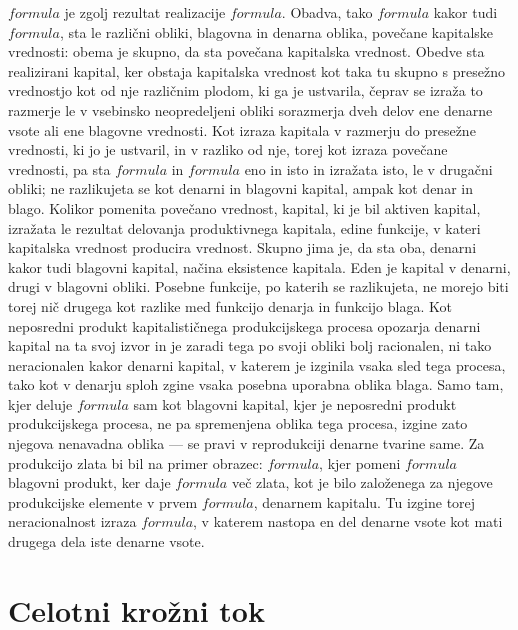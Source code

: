 \documentclass[a5paper]{scrbook}
\begin{document}
\( formula \) je zgolj rezultat realizacije \( formula \). Obadva, tako \( formula \) kakor tudi \( formula \), sta le različni obliki, blagovna in denarna oblika, povečane kapitalske vrednosti: obema je skupno, da sta povečana kapitalska vrednost. Obedve sta realizirani kapital, ker obstaja kapitalska vrednost kot taka tu skupno s presežno vrednostjo kot od nje različnim plodom, ki ga je ustvarila, čeprav se izraža to razmerje le v vsebinsko neopredeljeni obliki sorazmerja dveh delov ene denarne vsote ali ene blagovne vrednosti. Kot izraza kapitala v razmerju do presežne vrednosti, ki jo je ustvaril, in v razliko od nje, torej kot izraza povečane vrednosti, pa sta \( formula \) in \( formula \) eno in isto in izražata isto, le v drugačni obliki; ne razlikujeta se kot denarni in blagovni kapital, ampak kot denar in blago. Kolikor pomenita povečano vrednost, kapital, ki je bil aktiven kapital, izražata le rezultat delovanja produktivnega kapitala, edine funkcije, v kateri kapitalska vrednost producira vrednost. Skupno jima je, da sta oba, denarni kakor tudi blagovni kapital, načina eksistence kapitala. Eden je kapital v denarni, drugi v blagovni obliki. Posebne funkcije, po katerih se razlikujeta, ne morejo biti torej nič drugega kot razlike med funkcijo denarja in funkcijo blaga. Kot neposredni produkt kapitalističnega produkcijskega procesa opozarja denarni kapital na ta svoj izvor in je zaradi tega po svoji obliki bolj racionalen, ni tako neracionalen kakor denarni kapital, v katerem je izginila vsaka sled tega procesa, tako kot v denarju sploh zgine vsaka posebna uporabna oblika blaga. Samo tam, kjer deluje \( formula \) sam kot blagovni kapital, kjer je neposredni produkt produkcijskega procesa, ne pa spremenjena oblika tega procesa, izgine zato njegova nenavadna oblika --- se pravi v reprodukciji denarne tvarine same. Za produkcijo zlata bi bil na primer obrazec: \( formula \), kjer pomeni \( formula \) blagovni produkt, ker daje \( formula \) več zlata, kot je bilo založenega za njegove produkcijske elemente v prvem \( formula \), denarnem kapitalu. Tu izgine torej neracionalnost izraza \( formula \), v katerem nastopa en del denarne vsote kot mati drugega dela iste denarne vsote.

\section{Celotni krožni tok}
\end{document}
